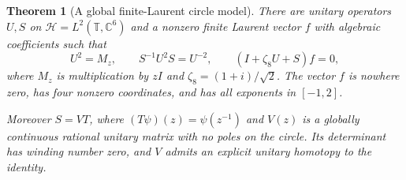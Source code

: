 \documentclass[11pt,a4paper,oneside]{report}
\newtheorem{theorem}{Theorem}[section]
\theoremstyle{definition}
\theoremstyle{remark}
\newcommand{\C}{\mathbb C}
\newcommand{\T}{\mathbb T}
\begin{document}
\begin{theorem}[A global finite-Laurent circle model]\label{M11:circle:model}
There are unitary operators $U,S$ on
$\mathcal H=L^2(\T,\C^6)$ and a nonzero finite Laurent vector
$f$ with algebraic coefficients such that
\begin{equation}\label{M11:circle:model-relations}
U^2=M_z,\qquad S^{-1}U^2S=U^{-2},\qquad
(I+\zeta_8U+S)f=0,
\end{equation}
where $M_z$ is multiplication by $zI$ and
$\zeta_8=(1+i)/\sqrt2$.
The vector $f$ is nowhere zero, has four nonzero coordinates,
and has all exponents in $[-1,2]$.

Moreover $S=VT$, where $(T\psi)(z)=\psi(z^{-1})$ and $V(z)$
is a globally continuous rational unitary matrix with no poles on
the circle. Its determinant has winding number zero, and $V$
admits an explicit unitary homotopy to the identity.
\end{theorem}
\end{document}

